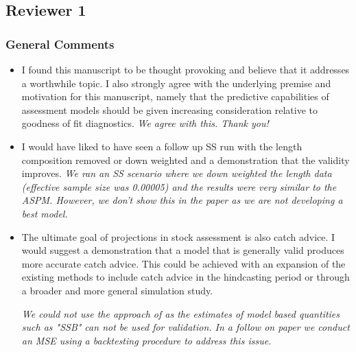 
\subsection*{Reviewer 1}

\subsubsection*{General Comments}

\begin{itemize}
    \item I found this manuscript to be thought provoking and believe that it addresses a worthwhile topic. I also strongly agree with the underlying premise and motivation for this manuscript, namely that the predictive capabilities of assessment models should be given increasing consideration relative to goodness of fit diagnostics. 
    \textit{\newline We agree with this. Thank you!}

        \item I would have liked to have seen a follow up SS run with the length composition removed or down weighted and a demonstration that the validity improves. 
    \textit{\newline We ran an SS scenario where we down weighted the length data (effective sample size was 0.00005) and the results were very similar to the ASPM. However, we don't show this in the paper as we are not developing a best model.}

    \item The ultimate goal of projections in stock assessment is also catch advice. I would suggest a demonstration that a model that is generally valid produces more accurate catch advice. This could be achieved with an expansion of the existing methods to include catch advice in the hindcasting period or through a broader and more general simulation study.
    
    \textit{\newline We could not use the approach of \cite{brooks2016retrospective} as the estimates of model based quantities such as "SSB" can not be used for validation. In a follow on paper we conduct an MSE using a backtesting procedure to address this issue.}


\end{itemize}
